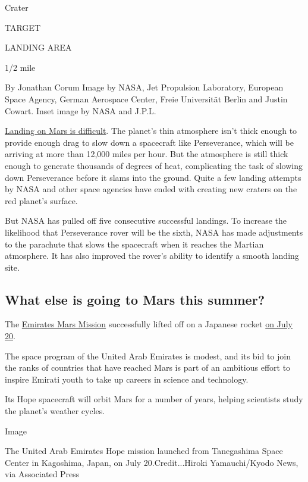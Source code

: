 Crater

TARGET

LANDING AREA

1/2 mile

By Jonathan Corum \textbar{} Image by NASA, Jet Propulsion Laboratory,
European Space Agency, German Aerospace Center, Freie Universität Berlin
and Justin Cowart. Inset image by NASA and J.P.L.

\href{https://www.nytimes3xbfgragh.onion/2020/07/29/science/nasa-mars-perseverance-rover.html}{Landing
on Mars is difficult}. The planet's thin atmosphere isn't thick enough
to provide enough drag to slow down a spacecraft like Perseverance,
which will be arriving at more than 12,000 miles per hour. But the
atmosphere is still thick enough to generate thousands of degrees of
heat, complicating the task of slowing down Perseverance before it slams
into the ground. Quite a few landing attempts by NASA and other space
agencies have ended with creating new craters on the red planet's
surface.

But NASA has pulled off five consecutive successful landings. To
increase the likelihood that Perseverance rover will be the sixth, NASA
has made adjustments to the parachute that slows the spacecraft when it
reaches the Martian atmosphere. It has also improved the rover's ability
to identify a smooth landing site.

\hypertarget{what-else-is-going-to-mars-this-summer}{%
\subsection{What else is going to Mars this
summer?}\label{what-else-is-going-to-mars-this-summer}}

The
\href{https://www.nytimes3xbfgragh.onion/2020/07/14/science/mars-united-arab-emirates.html}{Emirates
Mars Mission} successfully lifted off on a Japanese rocket
\href{https://www.nytimes3xbfgragh.onion/2020/07/19/science/emirates-mars-mission.html}{on
July 20}.

The space program of the United Arab Emirates is modest, and its bid to
join the ranks of countries that have reached Mars is part of an
ambitious effort to inspire Emirati youth to take up careers in science
and technology.

Its Hope spacecraft will orbit Mars for a number of years, helping
scientists study the planet's weather cycles.

Image

The United Arab Emirates Hope mission launched from Tanegashima Space
Center in Kagoshima, Japan, on July 20.Credit...Hiroki Yamauchi/Kyodo
News, via Associated Press

